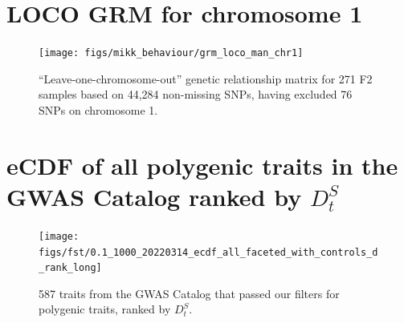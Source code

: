 \documentclass[
]{book}
\begin{document}
\hypertarget{loco-grm-for-chromosome-1}{%
\chapter{LOCO GRM for chromosome 1}\label{loco-grm-for-chromosome-1}}



\begin{figure}
\texttt{[image: figs/mikk\_behaviour/grm\_loco\_man\_chr1]} \caption{``Leave-one-chromosome-out'' genetic relationship matrix for 271 F2 samples based on 44,284 non-missing SNPs, having excluded 76 SNPs on chromosome 1.}\label{fig:loco-grm-chr1}
\end{figure}

\hypertarget{ecdf-of-all-polygenic-traits-in-the-gwas-catalog-ranked-by-d_ts}{%
\chapter{\texorpdfstring{eCDF of all polygenic traits in the GWAS Catalog ranked by \({D_t^S}\)}{eCDF of all polygenic traits in the GWAS Catalog ranked by \{D\_t\^{}S\}}}\label{ecdf-of-all-polygenic-traits-in-the-gwas-catalog-ranked-by-d_ts}}



\begin{figure}
\texttt{[image: figs/fst/0.1\_1000\_20220314\_ecdf\_all\_faceted\_with\_controls\_d\_rank\_long]} \caption{587 traits from the GWAS Catalog that passed our filters for polygenic traits, ranked by \({D_t^S}\).}\label{fig:eCDFall}
\end{figure}
\end{document}
